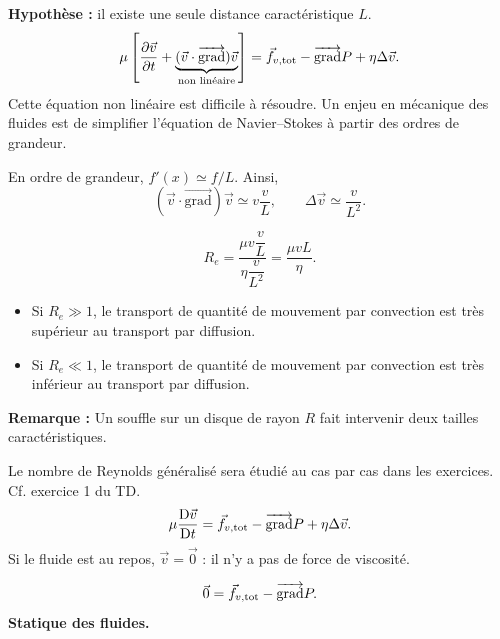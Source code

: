 \documentclass[11pt,a4paper]{article}
\newcommand{\grad}{\overrightarrow{\mathrm{grad}}}
\newcommand{\pd}[2]{\frac{\partial #1}{\partial #2}}
\newcommand{\etoiles}[1]{\foreach \i in {1,...,#1}{\mathord{\star}\,}}
\newcommand{\Dv}{\frac{\mathrm D\vec v}{\mathrm Dt}}
\newcommand{\conv}{(\vec v\cdot\grad)\vec v}
\newcommand{\Rey}{R_e}
\begin{document}
\textbf{Hypothèse :} il existe une seule distance caractéristique $L$.
\[\mu\left[\pd{\vec v}{t}+\underbrace{\conv}_{\text{non linéaire}}\right]=\fvt-\grad P+\eta\Delta\vec v.\]
Cette équation non linéaire est difficile à résoudre. Un enjeu en mécanique des fluides est de simplifier l'équation de Navier--Stokes à partir des ordres de grandeur.
\begin{center}\end{center}
En ordre de grandeur, $f'(x)\simeq f/L$. Ainsi,
\[\conv\simeq v\frac vL,\qquad\Delta\vec v\simeq\frac v{L^2}.\]
\begin{cadre}[etoiles={\etoiles{5}}]\[\Rey=\frac{\mu v\dfrac vL}{\eta\dfrac v{L^2}}=\frac{\mu vL}{\eta}.\]\end{cadre}
\begin{itemize}
\item Si $\Rey\gg1$, le transport de quantité de mouvement par convection est très supérieur au transport par diffusion.
\item Si $\Rey\ll1$, le transport de quantité de mouvement par convection est très inférieur au transport par diffusion.
\end{itemize}
\textbf{Remarque :} Un souffle sur un disque de rayon $R$ fait intervenir deux tailles caractéristiques.
\begin{center}\end{center}
Le nombre de Reynolds généralisé sera étudié au cas par cas dans les exercices. Cf. exercice 1 du TD.
\[\mu\Dv=\fvt-\grad P+\eta\Delta\vec v.\]
Si le fluide est au repos, $\vec v=\vec0$ : il n'y a pas de force de viscosité.
\begin{cadre}\[\vec0=\fvt-\grad P.\]\textbf{Statique des fluides.}\end{cadre}
\end{document}
